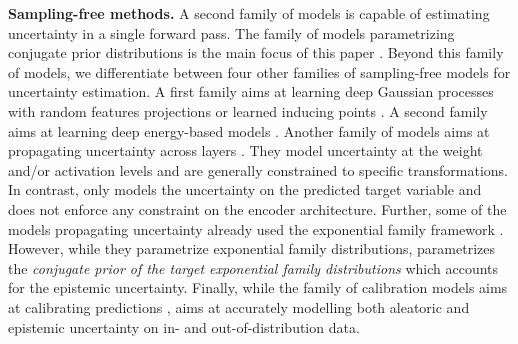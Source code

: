 \textbf{Sampling-free methods.} A second family of models is capable of estimating uncertainty in a single forward pass. The family of models parametrizing conjugate prior distributions is the main focus of this paper \citep{survey_evidential_uncertainty,evaluating_dbu,max_gap_id_ood,uncertainty-generative-classifier,multifaceted_uncertainty,graph_posterior, lightweight-prob-net}. Beyond this family of models, we differentiate between four other families of sampling-free models for uncertainty estimation. A first family aims at learning deep Gaussian processes with random features projections or learned inducing points \citep{uncertainty-distance-awareness, due, duq, uceloss}. A second family aims at learning deep energy-based models \citep{ood_ebm, jem_ebm}. Another family of models aims at propagating uncertainty across layers \citep{natural-parameter-network, sampling-free-variance-propagation, feed-forward-propagation, lightweight-prob-net, probabilistic-backprop-scalable-bnn}. They model uncertainty at the weight and/or activation levels and are generally constrained to specific transformations. In contrast, \oursacro{} only models the uncertainty on the predicted target variable and does not enforce any constraint on the encoder architecture. Further, some of the models propagating uncertainty already used the exponential family framework \citep{natural-parameter-network, deep-exponential-families}. However, while they parametrize exponential family distributions, \oursacro{} parametrizes the \emph{conjugate prior of the target exponential family distributions} which accounts for the epistemic uncertainty. Finally, while the family of calibration models aims at calibrating predictions \citep{accurate-uncertainties-deep-learning-regression, confidence-aware-learning, individual-calibration, distribution-calibration-regression, intra-order-preserving}, \oursacro{} aims at accurately modelling both aleatoric and epistemic uncertainty on in- and out-of-distribution data.
